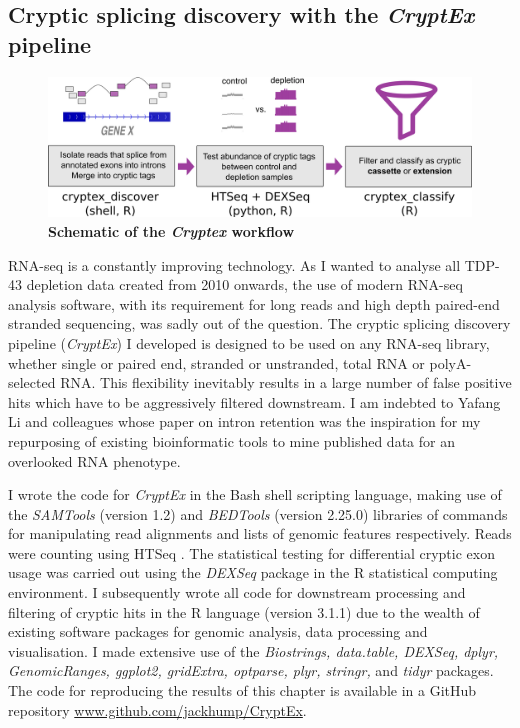 \subsection{Cryptic splicing discovery with the \emph{CryptEx} pipeline}

\begin{figure}
	\centering
	\includegraphics[width=14cm]{Figures/03_cryptic_exons/cryptex_pipeline.png}
	\caption{\textbf{Schematic of the \textit{Cryptex} workflow}}
	\label{cryptic_workflow}
\end{figure}


RNA-seq is a constantly improving technology. As I wanted to analyse all TDP-43 depletion data created from 2010 onwards, the use of modern RNA-seq analysis software, with its requirement for long reads and high depth paired-end stranded sequencing, was sadly out of the question. The cryptic splicing discovery pipeline (\textit{CryptEx}) I developed is designed to be used on any RNA-seq library, whether single or paired end, stranded or unstranded, total RNA or polyA-selected RNA. This flexibility inevitably results in a large number of false positive hits which have to be aggressively filtered downstream. I am indebted to Yafang Li and colleagues whose paper on intron retention \citep{Li2015-en} was the inspiration for my repurposing of existing bioinformatic tools to mine published data for an overlooked RNA phenotype.
 
I wrote the code for \textit{CryptEx} in the Bash shell scripting language, making use of the \emph{SAMTools} (version 1.2) \citep{Li2009-hm} and \emph{BEDTools} (version 2.25.0) \citep{Quinlan2010-up} libraries of commands for manipulating read alignments and lists of genomic features respectively. Reads were counting using HTSeq \citep{Anders2015-wz}. The statistical testing for differential cryptic exon usage was carried out using the \textit{DEXSeq} package \citep{Anders2012} in the R statistical computing environment. I subsequently wrote all code for downstream processing and filtering of cryptic hits in the R language (version 3.1.1) due to the wealth of existing software packages for genomic analysis, data processing and visualisation. I made extensive use of the \emph{Biostrings, data.table, DEXSeq, dplyr, GenomicRanges, ggplot2, gridExtra, optparse, plyr, stringr,} and \emph{tidyr} packages. The code for reproducing the results of this chapter is available in a GitHub repository \url{www.github.com/jackhump/CryptEx}.

